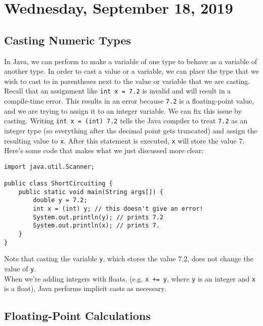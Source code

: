\section{Wednesday, September 18, 2019}

\subsection{Casting Numeric Types}

In Java, we can perform  to make a variable of one type to behave as a variable of another type. In order to cast a value or a variable, we can place the type that we wish to cast to in parentheses next to the value or variable that we are casting. \\


Recall that an assignment like \verb!int x = 7.2! is invalid and will result in a compile-time error. This results in an error because \verb!7.2! is a floating-point value, and we are trying to assign it to an integer variable. We can fix this issue by casting. Writing \verb!int x = (int) 7.2! tells the Java compiler to treat \verb!7.2! as an integer type (so everything after the decimal point gets truncated) and assign the resulting value to \verb!x!. After this statement is executed, \verb!x! will store the value $7$. \\


Here's some code that makes what we just discussed more clear:

\begin{lstlisting}
import java.util.Scanner;

public class ShortCircuiting {
    public static void main(String args[]) {
        double y = 7.2;
        int x = (int) y; // this doesn't give an error!
        System.out.println(y); // prints 7.2
        System.out.println(x); // prints 7.
    }
}
\end{lstlisting}

Note that casting the variable \verb!y!, which stores the value $7.2$, does not change the value of \verb!y!. \\

When we're adding integers with floats, (e.g. \verb!x += y!, where \verb!y! is an integer and \verb!x! is a float), Java performs implicit casts as necessary. 

\subsection{Floating-Point Calculations}


